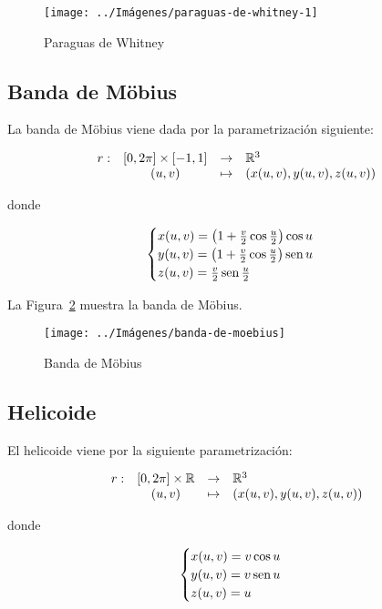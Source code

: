 \documentclass[10pt,a4paper]{article}
\begin{document}
\begin{figure}[htbp]
	\centering
	\texttt{[image: ../Imágenes/paraguas-de-whitney-1]}
	\caption{Paraguas de Whitney}
	\label{fig:paraguas-de-Whitney-1}
\end{figure}

\subsection{Banda de Möbius}

\begin{defi}
La banda de Möbius viene dada por la parametrización siguiente:

$$\begin{array}{rcll}
r : & [0, 2\pi] \times [-1,1] & \to & \mathbb{R}^3\\
& (u,v) & \mapsto & (x(u,v),y(u,v),z(u,v))
\end{array}$$

donde 

$$ \begin{cases}
x(u,v) = \left( 1 + \frac{v}{2}\cos\frac{u}{2} \right)\cos u \\
y(u,v) = \left( 1 + \frac{v}{2}\cos\frac{u}{2} \right)\mathop{\mbox{\normalfont sen}}\nolimits u \\
z(u,v) = \frac{v}{2}\mathop{\mbox{\normalfont sen}}\nolimits\frac{u}{2}
\end{cases} $$
\end{defi}

La Figura~\ref{fig:banda-de-moebius} muestra la banda de Möbius.

\begin{figure}[htbp]
\centering
\texttt{[image: ../Imágenes/banda-de-moebius]}
\caption{Banda de Möbius}
\label{fig:banda-de-moebius}
\end{figure}

\subsection{Helicoide}

\begin{defi}
El helicoide viene por la siguiente parametrización:

$$\begin{array}{rcll}
r : & [0, 2\pi] \times \mathbb{R} & \to & \mathbb{R}^3\\
& (u,v) & \mapsto & (x(u,v),y(u,v),z(u,v))
\end{array}$$

donde 

$$ \begin{cases}
x(u,v) = v\cos u \\
y(u,v) = v\mathop{\mbox{\normalfont sen}}\nolimits u \\
z(u,v) = u
\end{cases} $$
\end{defi}
\end{document}
